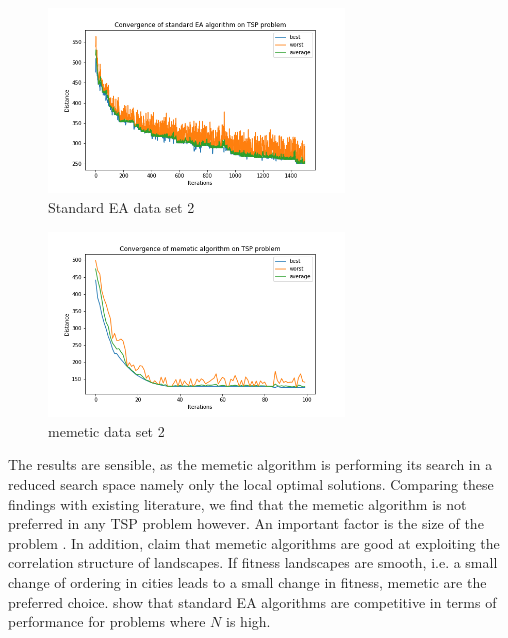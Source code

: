 \documentclass{article}
\begin{document}
\begin{enumerate}[label=\alph*)]
    
    \begin{figure}[H]
        \centering
        \includegraphics[width=0.7\textwidth]{Assignment 1/Figures/A1_6b1.png}
        \caption{Standard EA data set 2}
        \label{fig:A1_6c1}
    \end{figure}  
    \begin{figure}[H]
        \centering
        \includegraphics[width=0.7\textwidth]{Assignment 1/Figures/A1_6b2.png}
        \caption{memetic data set 2}
        \label{fig:A1_6c2}
    \end{figure}
    
    The results are sensible, as the memetic algorithm is performing its search in a reduced search space namely only the local optimal solutions.  Comparing these findings with existing literature, we find that the memetic algorithm is not preferred in any TSP problem however. An important factor is the size of the problem  \cite{merz2001memetic}. In addition, \cite{merz2001memetic} claim that memetic algorithms are good at exploiting the correlation structure of landscapes. If fitness landscapes are smooth, i.e. a small change of ordering in cities leads to a small change in fitness, memetic are the preferred choice.
     show that standard EA algorithms are competitive in terms of performance for problems where $N$ is high. 
\end{enumerate}
\end{document}

